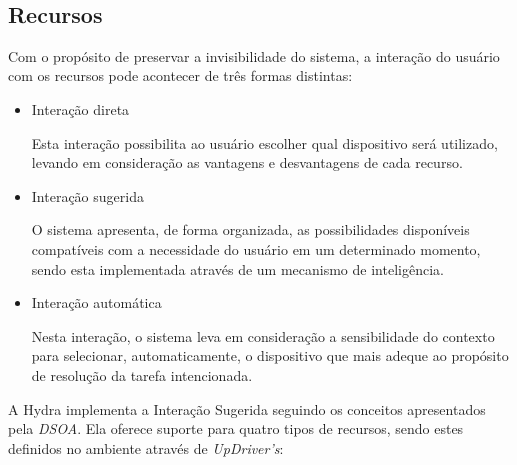 ~\subsection{Recursos}

	Com o propósito de preservar a invisibilidade do sistema, a interação do usuário com os recursos
	pode acontecer de três formas distintas:
	
	\begin{itemize}
	  \item Interação direta
	  
	  		Esta interação possibilita ao usuário escolher qual dispositivo será utilizado, levando
	  		em consideração as vantagens e desvantagens de cada recurso.
	  
	  \item Interação sugerida
	  
	  		O sistema apresenta, de forma organizada, as possibilidades disponíveis compatíveis com a
	  		necessidade do usuário em um determinado momento, sendo esta implementada através de um
	  		mecanismo de inteligência.
	  		
	  \item Interação automática
	  
	  		Nesta interação, o sistema leva em consideração a sensibilidade do contexto para selecionar,
	  		automaticamente, o dispositivo que mais adeque ao propósito de resolução da tarefa intencionada.
	  		
	\end{itemize}
	
	
	A Hydra implementa a Interação Sugerida seguindo os conceitos apresentados pela \textit{DSOA}.
	Ela oferece suporte para quatro tipos de recursos, sendo estes definidos no ambiente através de
	\textit{UpDriver's}:
	
